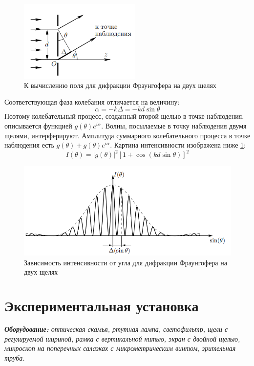 \begin{figure}
    \centering
    \includegraphics[width=6cm]{images/fraungofer_theory.png}
    \caption{К вычислению поля для дифракции Фраунгофера на двух щелях}
\end{figure}

Соответствующая фаза колебания отличается на величину:
\begin{equation}
    \alpha = -k\Delta = -k d\sin\theta
\end{equation}
Поэтому колебательный процесс, созданный второй щелью в точке наблюдения, описывается функцией $g(\theta)e^{i\alpha}$. Волны, посылаемые в точку наблюдения двумя щелями, интерферируют. Амплитуда суммарного колебательного процесса в точке наблюдения есть $g(\theta) + g(\theta)e^{i\alpha}$.
Картина интенсивности изображена ниже \ref{fig:intensity_fraungofer}:
\begin{equation}
    I(\theta) = |g(\theta)|^2 [1 + \cos(kd\sin\theta)]^2
\end{equation}
\begin{figure}[h!]
    \centering
    \includegraphics[width=14cm]{images/intensity_fraungofer.png}
    \caption{Зависимость интенсивности от угла для дифракции Фраунгофера на двух щелях}\label{fig:intensity_fraungofer}
\end{figure}





\section*{Экспериментальная установка}
\textit{\textbf{Оборудование:} оптическая скамья, ртутная лампа, светофильтр, щели с регулируемой шириной, рамка с вертикальной нитью, экран с двойной щелью, микроскоп на поперечных салазках с микрометрическим винтом, зрительная труба.}

